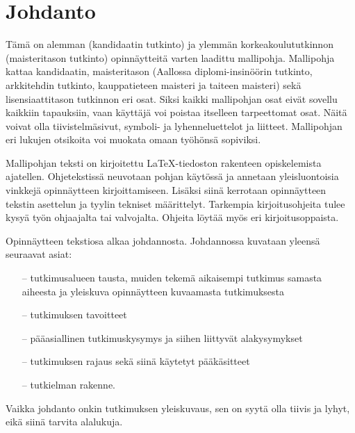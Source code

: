 \documentclass[finnish, 12pt, a4paper, elec, utf8, a-2b, online]{aaltothesis}
\begin{document}
\cleardoublepage

\section{Johdanto}
\label{luk:johdanto}

Tämä on alemman (kandidaatin tutkinto) ja ylemmän korkeakoulututkinnon
(maisteritason tutkinto) opinnäytteitä varten laadittu mallipohja. Mallipohja
kattaa kandidaatin, maisteritason (Aallossa diplomi-insinöörin tutkinto, 
arkkitehdin tutkinto, kauppatieteen maisteri ja taiteen maisteri) sekä 
lisensiaattitason tutkinnon eri osat. Siksi kaikki mallipohjan osat eivät 
sovellu kaikkiin tapauksiin, vaan käyttäjä voi poistaa itselleen tarpeettomat 
osat. Näitä voivat olla tiivistelmäsivut, symboli- ja lyhenneluettelot ja 
liitteet. Mallipohjan eri lukujen otsikoita voi muokata omaan työhönsä 
sopiviksi.

Mallipohjan teksti on kirjoitettu \LaTeX-tiedoston rakenteen opiskelemista 
ajatellen. Ohjetekstissä neuvotaan pohjan käytössä ja annetaan yleisluontoisia
vinkkejä opinnäytteen kirjoittamiseen. Lisäksi siinä kerrotaan opinnäytteen
tekstin asettelun ja tyylin tekniset määrittelyt. Tarkempia kirjoitusohjeita 
tulee kysyä työn ohjaajalta tai valvojalta. Ohjeita löytää myös eri 
kirjoitusoppaista.

Opinnäytteen tekstiosa alkaa johdannosta. Johdannossa kuvataan yleensä seuraavat 
asiat:
\begin{itemize}
	\item[--] tutkimusalueen tausta, muiden tekemä aikaisempi tutkimus samasta 
	aiheesta ja yleiskuva opinnäytteen kuvaamasta tutkimuksesta
	\item[--] tutkimuksen tavoitteet
	\item[--] pääasiallinen tutkimuskysymys ja siihen liittyvät alakysymykset
	\item[--] tutkimuksen rajaus sekä siinä käytetyt pääkäsitteet
	\item[--] tutkielman rakenne.
\end{itemize}

Vaikka johdanto onkin tutkimuksen yleiskuvaus, sen on syytä olla tiivis ja 
lyhyt, eikä siinä tarvita alalukuja.
\end{document}
